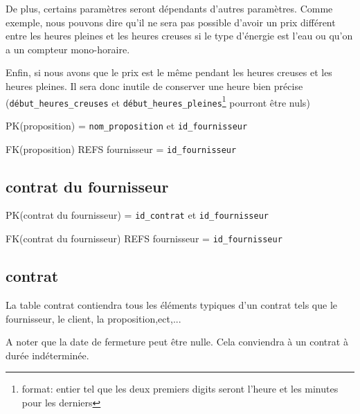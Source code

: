 \begin{flushleft}
De plus, certains paramètres seront dépendants d'autres paramètres. Comme exemple, nous pouvons dire qu'il ne sera pas possible d'avoir  un prix différent entre les heures pleines et les heures creuses si le type d'énergie est l'eau ou qu'on a un compteur mono-horaire.
\end{flushleft}

\begin{flushleft}
Enfin, si nous avons que le prix est le même pendant les heures creuses et les heures pleines. Il sera donc inutile de conserver une heure bien précise (\texttt{début\_heures\_creuses} et \texttt{début\_heures\_pleines}\footnote{format: entier tel que les deux premiers digits seront l'heure et les minutes pour les derniers} pourront être nuls)
\end{flushleft}

\begin{flushleft}
PK(proposition) = \texttt{nom\_proposition} et \texttt{id\_fournisseur}
\end{flushleft}

\begin{flushleft}
FK(proposition) REFS fournisseur = \texttt{id\_fournisseur}
\end{flushleft}
\subsection{contrat du fournisseur}
\begin{flushleft}
PK(contrat du fournisseur) = \texttt{id\_contrat} et \texttt{id\_fournisseur}
\end{flushleft}

\begin{flushleft}
FK(contrat du fournisseur) REFS fournisseur = \texttt{id\_fournisseur}
\end{flushleft}
\subsection{contrat}
\begin{flushleft}
La table contrat contiendra tous les éléments typiques d'un contrat tels que le fournisseur, le client, la proposition,ect,...
\end{flushleft}

\begin{flushleft}
A noter que la date de fermeture peut être nulle. Cela conviendra à un contrat à durée indéterminée.
\end{flushleft}

